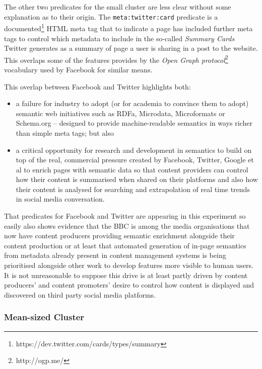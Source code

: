 The other two predicates for the small cluster are less clear without
some explanation as to their origin. The \texttt{meta:twitter:card}
predicate is a
documented\footnote{https://dev.twitter.com/cards/types/summary}
HTML meta tag that to indicate a page has included further meta tags
to control which metadata to include in the so-called
\emph{Summary Cards} Twitter generates as a summary of page a user
is sharing in a post to the website. This overlaps some of the
features provides by the \emph{Open Graph protocol}\footnote{http://ogp.me/}
vocabulary used by Facebook for similar means.

This overlap between Facebook and Twitter highlights both:

\begin{itemize}
  \item a failure
    for industry to adopt (or for academia to convince them to adopt)
    semantic web initiatives such as RDFa,
    Microdata, Microformats or Schema.org -- designed to provide
    machine-readable semantics in ways richer than simple meta tags; but
    also
  \item a critical opportunity for research and development in semantics
    to build on top of the real, commercial pressure created by Facebook,
    Twitter, Google et al to enrich pages with semantic data so that
    content providers can control how their content is summarised when
    shared on their platforms and also how their content is analysed for
    searching and extrapolation of real time trends in social media
    conversation.
\end{itemize}

That predicates for Facebook and Twitter are appearing in this
experiment so easily also shows evidence that the BBC is among the
media organisations that now have content producers providing
semantic enrichment alongside their content production or at least
that automated generation of in-page semantics from metadata already
present in content management systems is being prioritised alongside
other work to develop features more visible to human users. It is not
unreasonable to suppose this drive is at least partly driven by
content producers' and content promoters' desire to control how
content is displayed and discovered on third party social media
platforms.

\subsubsection{Mean-sized Cluster}

